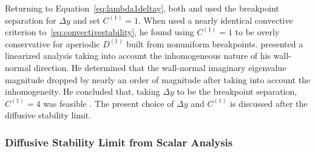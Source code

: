 Returning to Equation~\eqref{eq:lambda1deltay}, both
\citeauthor{Guarini1998} and \citeauthor{Kwok2002} used the breakpoint
separation for $\Delta{}y$ and set $C^{(1)} = 1$.  When
\citeauthor{Venugopal2003} used a nearly identical convective criterion
to~\eqref{eq:convectivestability}, he found using $C^{(1)} = 1$ to be overly
conservative for aperiodic $D^{(1)}$ built from nonuniform breakpoints.
\citet[\textsection{}3.2]{Venugopal2003} presented a linearized analysis taking
into account the inhomogeneous nature of his wall-normal direction.  He
determined that the wall-normal imaginary eigenvalue magnitude dropped by nearly
an order of magnitude after taking into account the inhomogeneity.  He concluded
that, taking $\Delta{}y$ to be the breakpoint separation, $C^{(1)} = 4$ was
feasible \citep[Equation~3.29]{Venugopal2003}.  The present choice of
$\Delta{}y$ and $C^{(1)}$ is discussed after the diffusive stability limit.

\subsubsection{Diffusive Stability Limit from Scalar Analysis}
\label{sec:diffusivestability}

